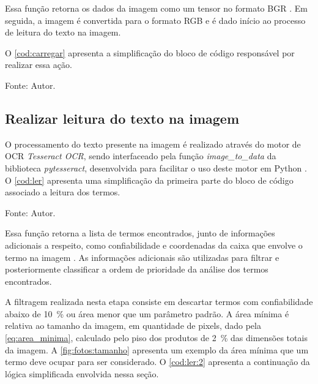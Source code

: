Essa função retorna os dados da imagem como um tensor no formato \acs{BGR} \cite{CV2imread}.
Em seguida, a imagem é convertida para o formato \ac{RGB} e é dado início ao processo de leitura do texto na imagem.

O \autoref{cod:carregar} apresenta a simplificação do bloco de código responsável por realizar essa ação.

\begin{lstfloat}[htbp]
    \centering
    
    \caption*{Fonte: Autor.}
\end{lstfloat}

\subsection{Realizar leitura do texto na imagem}\label{ssec:ler}

O processamento do texto presente na imagem é realizado através do motor de \ac{OCR} \textit{Tesseract OCR}, sendo interfaceado pela função \textit{image\_to\_data} da biblioteca \textit{pytesseract}, desenvolvida para facilitar o uso deste motor em Python \cite{samuelhoffstaetter2024, tesseract2024}.
O \autoref{cod:ler} apresenta uma simplificação da primeira parte do bloco de código associado a leitura dos termos.

\begin{lstfloat}[htbp]
    \centering
    
    \caption*{Fonte: Autor.}
\end{lstfloat}


Essa função retorna a lista de termos encontrados, junto de informações adicionais a respeito, como confiabilidade e coordenadas da caixa que envolve o termo na imagem \cite{samuelhoffstaetter2024}.
As informações adicionais são utilizadas para filtrar e posteriormente classificar a ordem de prioridade da análise dos termos encontrados.

A filtragem realizada nesta etapa consiste em descartar termos com confiabilidade abaixo de \SI{10}{\percent} ou área menor que um parâmetro padrão.
A área mínima é relativa ao tamanho da imagem, em quantidade de \acp{pixel}, dado pela \autoref{eq:area_minima}, calculado pelo piso dos produtos de \SI{2}{\percent} das dimensões totais da imagem.
A \autoref{fig:fotos:tamanho} apresenta um exemplo da área mínima que um termo deve ocupar para ser considerado.
O \autoref{cod:ler:2} apresenta a continuação da lógica simplificada envolvida nessa seção.

